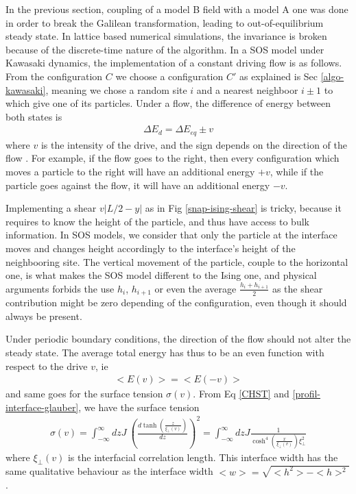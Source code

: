 In the previous section, coupling of a model B field with a model A one was done in order to break the Galilean transformation, leading to out-of-equilibrium steady state. In lattice based numerical simulations, the invariance is broken because of the discrete-time nature of the algorithm.
In a SOS model under Kawasaki dynamics, the implementation of a constant driving flow is as follows. From the configuration $C$ we choose a configuration $C'$ as explained is Sec \ref{algo-kawasaki}, meaning we chose a random site $i$ and a nearest neighboor $i\pm1 $ to which give one of its particles. Under a flow, the difference of energy between both states is
\begin{align}
    \Delta E_d = \Delta E_{eq} \pm v
\end{align}
where $v$ is the intensity of the drive, and the sign depends on the direction of the flow . For example, if the flow goes to the right, then every configuration which moves a particle to the right will have an additional energy $+v$, while if the particle goes against the flow, it will have an additional energy $-v$.

Implementing a shear $v |L/2-y|$  as in Fig \ref{snap-ising-shear} is tricky, because it requires to know the height of the particle, and thus have access to bulk information. In SOS models, we consider that only the particle at the interface moves and changes height accordingly to the interface's height of the neighbooring site. The vertical movement of the particle, couple to the horizontal one, is what makes the SOS model different to the Ising one, and physical arguments forbids the use $h_i$, $h_{i+1}$ or even the average $\frac{h_i+h_{i+1}}{2}$ as the shear contribution might be zero depending of the configuration, even though it should always be present. 

Under periodic boundary conditions, the direction of the flow should not alter the steady state. The average total energy has thus to be an even function with respect to the drive $v$, ie
\begin{align}
    <E(v)> = <E(-v)>
\end{align}
and same goes for the surface tension $\sigma(v)$.
From Eq \eqref{CHST} and \eqref{profil-interface-glauber}, we have the surface tension
\begin{align}
    \sigma(v) = \int_{-\infty}^{\infty} dz J\  \left( \frac{d \tanh \left(\frac{z}{\xi_\perp(v)} \right)}{dz} \right)^2 = \int_{-\infty}^{\infty} dz  J \frac{1}{\cosh^4(\frac{x}{\xi_\perp(v)}) \xi_\perp^2}
    \label{int-sigma}
\end{align}
where $\xi_\perp(v)$ is the interfacial correlation length. This interface width has the same qualitative behaviour as the interface width $<w> = \sqrt{<h^2>-<h>^2}$. 

